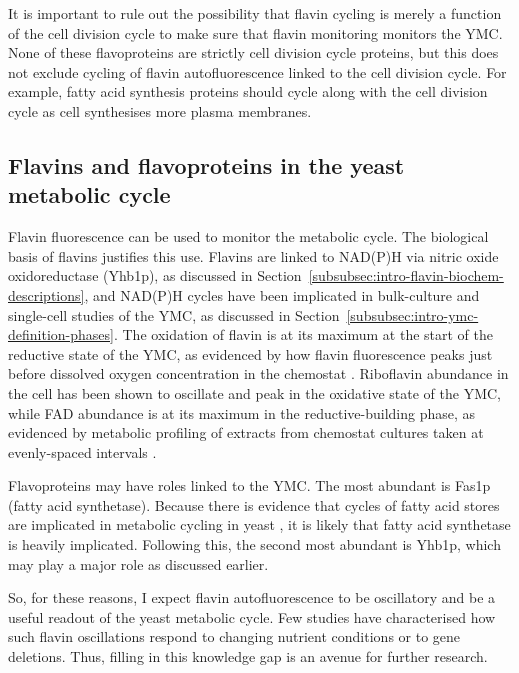It is important to rule out the possibility that flavin cycling is merely a function of the cell division cycle to make sure that flavin monitoring monitors the YMC\@.
None of these flavoproteins are strictly cell division cycle proteins, but this does not exclude cycling of flavin autofluorescence linked to the cell division cycle.
For example, fatty acid synthesis proteins should cycle along with the cell division cycle as cell synthesises more plasma membranes.

\subsection{Flavins and flavoproteins in the yeast metabolic cycle}
\label{subsec:intro-flavin-ymc}

Flavin fluorescence can be used to monitor the metabolic cycle.
The biological basis of flavins justifies this use.
Flavins are linked to NAD(P)H via nitric oxide oxidoreductase (Yhb1p), as discussed in Section~\ref{subsubsec:intro-flavin-biochem-descriptions}, and NAD(P)H cycles have been implicated in bulk-culture \parencite{tuLogicYeastMetabolic2005} %
and single-cell \parencite{papagiannakisAutonomousMetabolicOscillations2017} studies of the YMC, as discussed in Section~\ref{subsubsec:intro-ymc-definition-phases}.
The oxidation of flavin is at its maximum at the start of the reductive state of the YMC, as evidenced by how flavin fluorescence peaks just before dissolved oxygen concentration in the chemostat \parencite{murrayRedoxRegulationRespiring2011,sasidharanTimeStructureYeastMetabolism2012}.
Riboflavin abundance in the cell has been shown to oscillate and peak in the oxidative state of the YMC, while FAD abundance is at its maximum in the reductive-building phase, as evidenced by metabolic profiling of extracts from chemostat cultures taken at evenly-spaced intervals \parencite{tuCyclicChangesMetabolic2007}.

Flavoproteins may have roles linked to the YMC\@.
The most abundant is Fas1p (fatty acid synthetase).
Because there is evidence that cycles of fatty acid stores are implicated in metabolic cycling in yeast \parencite{campbellBuildingBlocksAre2020}, it is likely that fatty acid synthetase is heavily implicated.
Following this, the second most abundant is Yhb1p, which may play a major role as discussed earlier.

So, for these reasons, I expect flavin autofluorescence to be oscillatory and be a useful readout of the yeast metabolic cycle.
Few studies have characterised how such flavin oscillations respond to changing nutrient conditions or to gene deletions.
Thus, filling in this knowledge gap is an avenue for further research.

